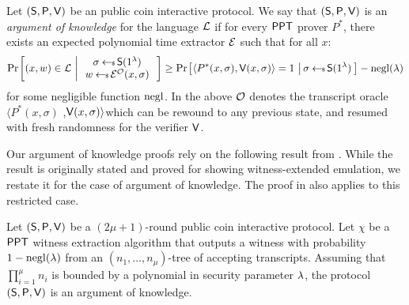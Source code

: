 \begin{definition}\label{def:argofknowledge}
Let $(\mathsf{S},\mathsf{P},\mathsf{V})$ be an public coin interactive protocol. We say that
$(\mathsf{S},\mathsf{P},\mathsf{V})$ is an {\em argument of knowledge} for the language
$\mathcal{L}$ if for every $\mathsf{PPT}$
prover $P^\ast$, there exists an expected polynomial time extractor $\mathcal{E}$ such that for all $x$:
\small
\begin{align}
\condprob{(x,w)\in \mc{L}}{
\begin{array}{c}
\sigma\sample\setup(\secparam) \\
w\sample \extr^{\mc{O}}(x,\sigma)
\end{array}
}
\geq \condprob{\langle
P^\ast(x,\sigma),\verifier(x,\sigma)\rangle=1}{\sigma\sample \setup(\secparam)} -
\negl(\lambda)
\end{align}
for some negligible function $\mathrm{negl}$. In the above $\mathcal{O}$ denotes the transcript oracle  $\langle P^\ast(x,\sigma)$ ,$\mathsf{V}(x,\sigma)\rangle$which can be rewound to any previous state, and resumed with fresh randomness for the
verifier $\mathsf{V}$.
\end{definition}

Our argument of knowledge proofs rely on the following result from \cite{bulletproofs}.
While the result is originally stated and proved for showing witness-extended
emulation, we restate it for the case of argument of knowledge. The proof in
\cite{InnerProductDLS} also applies to this restricted case.

\begin{lemma}\label{lem:forkinglemma}
Let $(\mathsf{S},\mathsf{P},\mathsf{V})$ be a $(2\mu+1)$-round public coin interactive
protocol. Let $\chi$ be a $\mathsf{PPT}$ witness extraction algorithm that outputs a
witness with probability $1-\mathrm{negl}(\lambda)$ from an $(n_1,\ldots,n_\mu)$-tree
of accepting transcripts. Assuming that $\prod_{i=1}^\mu n_i$ is bounded by a
polynomial in security parameter $\lambda$, the protocol
$(\mathsf{S},\mathsf{P},\mathsf{V})$ is an argument of knowledge.
\end{lemma}

